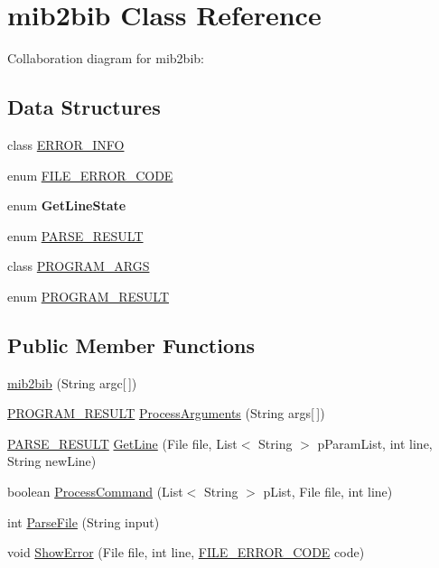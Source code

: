 \hypertarget{classmib2bib_1_1mib2bib}{}\section{mib2bib Class Reference}
\label{classmib2bib_1_1mib2bib}


Collaboration diagram for mib2bib\+:
\subsection*{Data Structures}
\begin{DoxyCompactItemize}
\item 
class \hyperlink{classmib2bib_1_1mib2bib_1_1_e_r_r_o_r___i_n_f_o}{E\+R\+R\+O\+R\+\_\+\+I\+N\+F\+O}
\item 
enum \hyperlink{enummib2bib_1_1mib2bib_1_1_f_i_l_e___e_r_r_o_r___c_o_d_e}{F\+I\+L\+E\+\_\+\+E\+R\+R\+O\+R\+\_\+\+C\+O\+D\+E}
\item 
enum {\bfseries Get\+Line\+State}
\item 
enum \hyperlink{enummib2bib_1_1mib2bib_1_1_p_a_r_s_e___r_e_s_u_l_t}{P\+A\+R\+S\+E\+\_\+\+R\+E\+S\+U\+L\+T}
\item 
class \hyperlink{classmib2bib_1_1mib2bib_1_1_p_r_o_g_r_a_m___a_r_g_s}{P\+R\+O\+G\+R\+A\+M\+\_\+\+A\+R\+G\+S}
\item 
enum \hyperlink{enummib2bib_1_1mib2bib_1_1_p_r_o_g_r_a_m___r_e_s_u_l_t}{P\+R\+O\+G\+R\+A\+M\+\_\+\+R\+E\+S\+U\+L\+T}
\end{DoxyCompactItemize}
\subsection*{Public Member Functions}
\begin{DoxyCompactItemize}
\item 
\hyperlink{classmib2bib_1_1mib2bib_a6490b791d4502635b0ee727cf586b130}{mib2bib} (String argc\mbox{[}$\,$\mbox{]})
\item 
\hyperlink{enummib2bib_1_1mib2bib_1_1_p_r_o_g_r_a_m___r_e_s_u_l_t}{P\+R\+O\+G\+R\+A\+M\+\_\+\+R\+E\+S\+U\+L\+T} \hyperlink{classmib2bib_1_1mib2bib_ae13fd6ee21cda02965b5931615374b4d}{Process\+Arguments} (String args\mbox{[}$\,$\mbox{]})
\item 
\hyperlink{enummib2bib_1_1mib2bib_1_1_p_a_r_s_e___r_e_s_u_l_t}{P\+A\+R\+S\+E\+\_\+\+R\+E\+S\+U\+L\+T} \hyperlink{classmib2bib_1_1mib2bib_a41f73cce9616d534566aed0aa55ab981}{Get\+Line} (File file, List$<$ String $>$ p\+Param\+List, int line, String new\+Line)
\item 
boolean \hyperlink{classmib2bib_1_1mib2bib_adfe2a5078ea898f9fb57ff41c8336295}{Process\+Command} (List$<$ String $>$ p\+List, File file, int line)
\item 
int \hyperlink{classmib2bib_1_1mib2bib_a9616f26e207d4b2053e2d1972a7f575e}{Parse\+File} (String input)
\item 
void \hyperlink{classmib2bib_1_1mib2bib_a1d94cea0f5abc9bb28bd0a5e12ad2348}{Show\+Error} (File file, int line, \hyperlink{enummib2bib_1_1mib2bib_1_1_f_i_l_e___e_r_r_o_r___c_o_d_e}{F\+I\+L\+E\+\_\+\+E\+R\+R\+O\+R\+\_\+\+C\+O\+D\+E} code)
\end{DoxyCompactItemize}
